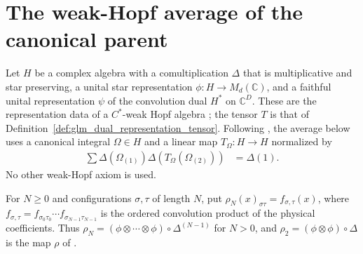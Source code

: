 \section{The weak-Hopf average of the canonical parent}
\label{sec:glm_wha_average}

Let $H$ be a complex algebra with a comultiplication $\Delta$ that is
multiplicative and star preserving, a unital star representation
$\phi:H\to M_d(\mathbb C)$, and a faithful unital representation
$\psi$ of the convolution dual $H^*$ on $\mathbb C^D$. These are the
representation data of a $C^*$-weak Hopf algebra
\cite[Section~4]{Molnar2022MPOAlgebrasI}; the tensor $T$ is that of
Definition~\ref{def:glm_dual_representation_tensor}. Following
\cite[Appendix~B]{GarreRubio2023MPOSym}, the average below uses a canonical
integral $\Omega\in H$ and a linear map $T_\Omega:H\to H$ normalized by
\begin{align}
    \sum\Delta(\Omega_{(1)})\Delta(T_\Omega(\Omega_{(2)})) & =\Delta(1).
    \label{eq:glm_wha_integral_normalization}
\end{align}
No other weak-Hopf axiom is used.

\begin{definition}
    \label{def:glm_wha_represented_coproduct}
    \leanok
    For $N\geq0$ and configurations $\sigma,\tau$ of length $N$, put
    $\rho_N(x)_{\sigma\tau}=f_{\sigma,\tau}(x)$, where
    $f_{\sigma,\tau}=f_{\sigma_0\tau_0}\cdots f_{\sigma_{N-1}\tau_{N-1}}$
    is the ordered convolution product of the physical coefficients. Thus
    $\rho_N=(\phi\otimes\cdots\otimes\phi)\circ\Delta^{(N-1)}$ for $N>0$, and
    $\rho_2=(\phi\otimes\phi)\circ\Delta$ is the map $\rho$ of
    \cite[Appendix~B]{GarreRubio2023MPOSym}.
\end{definition}

